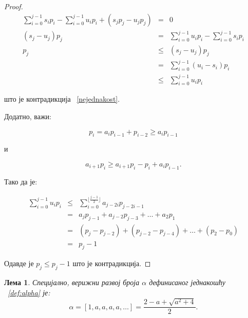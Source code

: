 \documentclass[a4paper]{article}
\newtheorem{lemma}{Лема}
\begin{document}
\begin{proof}
	\begin{eqnarray*}
		\sum_{i=0}^{j-1} s_{i}p_{i} - \sum_{i=0}^{j-1} u_{i}p_{i} + (s_{j}p_{j}  - u_{j}p_{j}) &=& 0\\
		(s_{j} - u_{j})p_{j} &=& \sum_{i=0}^{j-1} u_{i}p_{i} - \sum_{i=0}^{j-1} s_{i}p_{i}\\
		p_{j} &\leq& (s_{j} - u_{j})p_{j}\\  
		&=& \sum_{i=0}^{j-1} (u_{i} - s_{i})p_{i}\\
		&\leq& \sum_{i=0}^{j-1} u_{i}p_{i}
 	\end{eqnarray*}
	
	што је контрадикција ~\eqref{nejednakost}.
	
	Додатно, важи:
	
	\begin{displaymath}
		p_{i} = a_{i}p_{i-1} + p_{i-2} \geq a_{i}p_{i-1}
	\end{displaymath} 
	
	и
	
	\begin{displaymath}
		a_{i+1}p_{i} \ge a_{i+1}p_{i} - p_{i} + a_{i}p_{i-1}.
	\end{displaymath}
	
	Тако да је:
	 
	\begin{eqnarray*}
		\sum_{i=0}^{j-1} u_{i}p_{i} &\leq& \sum_{i=0}^{\lfloor \frac{j-1}{2} \rfloor} a_{j-2i}p_{j-2i-1}\\
									&=& a_{j}p_{j-1} + a_{j-2}p_{j-3} + \ldots + a_{2}p_{1}\\
									&=& (p_{j} - p_{j-2}) + (p_{j-2} - p_{j-4}) + \ldots + (p_{2} - p_{0})\\
									&=& p_{j} - 1
	\end{eqnarray*}
	
	Одавде је $ p_{j} \leq p_{j} - 1 $ што је контрадикција.
	
\end{proof}

\begin{lemma}
	Специјално, верижни развој броја $ \alpha $ дефинисаног једнакошћу ~\eqref{def:alpha} је:
	\begin{displaymath}
	\alpha = [1 ,a, a, a, a, \dots] = \frac{2 - a + \sqrt{a^2 + 4}}{2}.
	\end{displaymath}  
\end{lemma}
\end{document}

